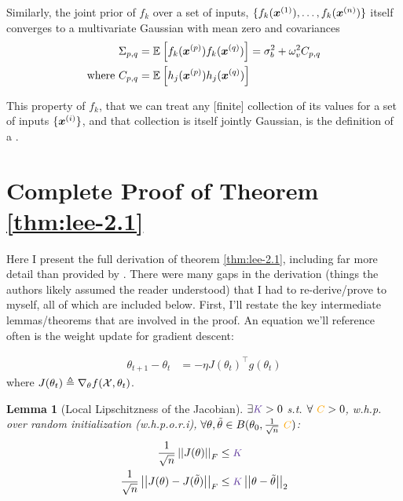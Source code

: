 \documentclass{article}
\newtheorem{lemma}[theorem]{Lemma}
\newcommand\mc{\mathcal}
\begin{document}
\begin{appendices}
Similarly, the joint prior of $f_k$ over a set of inputs, $\{ f_k(\ivec[1]{x}), \ldots, f_k(\ivec[n]{x}) \}$ itself converges to a multivariate Gaussian with mean zero and covariances 
\begin{align}
	\Sigma_{p,q} 
	&= \E{f_k(\ivec[p]{x}) f_k(\ivec[q]{x}) } 
	= \sigma_b^2 + \omega_v^2 C_{p,q} \\
	\text{where } C_{p,q} &= \E{h_j(\ivec[p]{x}) h_j(\ivec[q]{x})}
\end{align}

This property of $f_k$, that we can treat any [finite] collection of its values for a set of inputs $\{\ivec[i]{x}\}$, and that collection is itself jointly Gaussian, is the definition of a . 

\clearpage
\section{Complete Proof of Theorem \ref{thm:lee-2.1}}\label{sec:proof-lee}

Here I present the full derivation of theorem \ref{thm:lee-2.1}, including far more detail than provided by \cite{lee2019}. There were many gaps in the derivation (things the authors likely assumed the reader understood) that I had to re-derive/prove to myself, all of which are included below. First, I'll restate the key intermediate lemmas/theorems that are involved in the proof. An equation we'll reference often is the weight update for gradient descent: 

\marginnote{
	$$g(\theta_t) \in \R^{k|\mc X|}$$
	$$J(\theta_t) \in \R^{k|\mc X| \times |\theta|}$$}
\begin{align}
	\theta_{t+1} - \theta_t 
	&= - \eta J(\theta_t)^\top g(\theta_t) \label{eq:S45}
\end{align}
where $J(\theta_t) \triangleq \J$. 

\begin{lemma}[Local Lipschitzness of the Jacobian]\label{lemma:lee-1}
	$\exists \k > 0  $ s.t. $\forall \c > 0$, w.h.p. over random initialization (w.h.p.o.r.i), $\forall \theta, \tilde \theta \in B(\theta_0, \inv{\sqrt n} \c ) $:
	\begin{align}
		\inv{\sqrt n} \norm[F]{J(\theta)} 
		&\leq \k  \label{eq:S47-1} \\
		\inv{\sqrt n}\norm[F]{J(\theta) - J(\tilde \theta)} 
		&\leq \k \norm{\theta - \tilde\theta} \label{eq:S47-2}
	\end{align}
	

\end{lemma}
\end{appendices}
\end{document}
